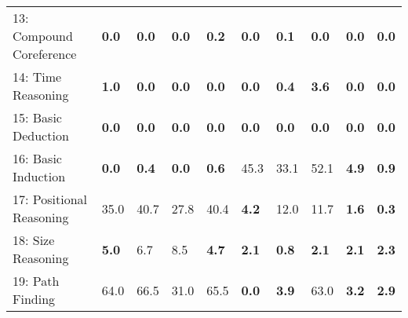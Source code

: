 \documentclass{article} \usepackage{iclr2018_conference,times}
\begin{document}
\begin{table}[t]
\begin{adjustbox}{max width=\textwidth}
\begin{tabular}{l|lllllllll}
13: Compound Coreference             & \textbf{0.0}                       & \textbf{0.0}                        & \textbf{0.0} & \textbf{0.2}                     & \textbf{0.0}                      & \textbf{0.1} & \textbf{0.0}                        & \textbf{0.0}                 & \textbf{0.0}                     \\
14: Time Reasoning                   & \textbf{1.0}                       &\textbf{0.0}                        & \textbf{0.0}                         &\textbf {0.0}                     & \textbf{0.0}                      & \textbf{0.4} & \textbf{3.6}                      &\textbf{0.0}                    & \textbf{0.0}                    \\
15: Basic Deduction                  & \textbf{0.0}                       & \textbf{0.0}                        &\textbf{0.0}                         & \textbf{0.0}                    &\textbf{0.0}                    & \textbf{0.0}                     &\textbf{0.0}                        & \textbf{0.0}                   &\textbf{0.0}                     \\
16: Basic Induction                  &\textbf{0.0}                       & \textbf{0.4}                        & \textbf{0.0}                         & \textbf{0.6}                   & 45.3                     & 33.1                    & 52.1                       & \textbf{4.9}                   & \textbf{0.9}                    \\
17: Positional Reasoning             & 35.0                        & 40.7                       & 27.8                        & 40.4                    & \textbf{4.2}                      & 12.0                    & 11.7                       & \textbf{1.6}                    & \textbf{0.3} \\
18: Size Reasoning                   & \textbf{5.0}                      & 6.7                        & 8.5                         & \textbf{4.7}                     & \textbf{2.1}                     & \textbf{0.8}                     & \textbf{2.1}                        & \textbf{2.1}                    & \textbf{2.3}                     \\
19: Path Finding                     & 64.0                      & 66.5                       & 31.0                        & 65.5                    & \textbf{0.0}                      & \textbf{3.9}                     & 63.0                       & \textbf{3.2}                    & \textbf{2.9}                     \\

\end{tabular}
\end{adjustbox}
\end{table}
\end{document}
